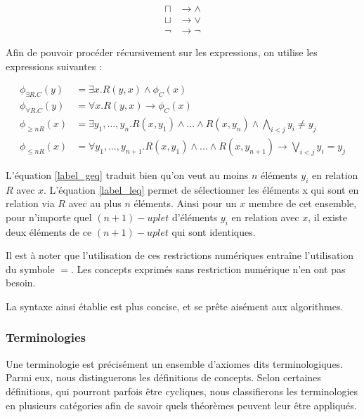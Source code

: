 \begin{align}
  \sqcap & \longrightarrow \wedge \\
  \sqcup & \longrightarrow \vee \\
  \neg & \longrightarrow \neg
\end{align}

\par Afin de pouvoir procéder récursivement sur les expressions, on utilise les expressions suivantes :

\begin{align}
  \phi_{\exists R.C}(y) & = \exists x.R(y,x) \wedge \phi_C(x) \\
  \phi_{\forall R.C}(y) & = \forall x.R(y,x) \longrightarrow \phi_C(x)\\
  \phi_{\geq nR}(x) & = \exists y_1, \ldots, y_n.R(x,y_1)\wedge \ldots \wedge R(x,y_n) \wedge \bigwedge_{i<j}y_i \neq y_j \label{label_geq}\\
  \phi_{\leq nR}(x) & = \forall y_1, \ldots, y_{n+1}.R(x,y_1)\wedge \ldots \wedge R(x,y_{n+1}) \longrightarrow \bigvee_{i<j}y_i = y_j \label{label_leq}
\end{align}

\par L'équation \ref{label_geq} traduit bien qu'on veut au moins $n$ éléments $y_i$ en relation $R$ avec $x$. L'équation \ref{label_leq} permet de sélectionner les éléments x qui sont en relation via $R$ avec au plus $n$ éléments. Ainsi pour un $x$ membre de cet ensemble, pour n'importe quel $(n+1)-uplet$ d'éléments $y_i$ en relation avec $x$, il existe deux éléments de ce $(n+1)-uplet$ qui sont identiques.

\par Il est à noter que l'utilisation de ces restrictions numériques entraîne l'utilisation du symbole $=$. Les concepts exprimés sans restriction numérique n'en ont pas besoin.

\par La syntaxe ainsi établie est plus concise, et se prête aisément aux algorithmes.

\subsubsection{Terminologies}
\label{sec:terminologies}

\par Une terminologie est précisément un ensemble d'axiomes dits terminologiques. Parmi eux, nous distinguerons les définitions de concepts. Selon certaines définitions, qui pourront parfois être cycliques, nous classifierons les terminologies en plusieurs catégories afin de savoir quels théorèmes peuvent leur être appliqués.

